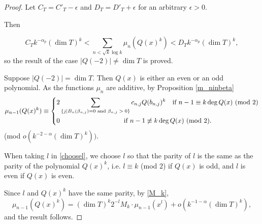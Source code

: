 \documentclass[11 pt]{amsart}
\theoremstyle{plain}
\newtheorem{lemma}[thm]{Lemma}
\theoremstyle{definition}
\theoremstyle{remark}
\def\Z{\mathbb{Z}}
\def\b{\beta}
\def\m{\mu}
\begin{document}
\begin{proof}
Let $C_T=C'_T - \epsilon$ and $D_T=D'_T + \epsilon$ for an arbitrary $\epsilon>0$.

Then

\begin{equation*}
    C_Tk^{-\alpha_p}(\dim T)^k <  \sum_{ n< \sqrt{k}\log k } \m_n(Q(x)^k)< D_T k^{-\alpha_p}(\dim T)^k,
\end{equation*}
so the result of the  case $\vert Q(-2)\vert \neq \dim T$ is proved.


\vspace{5mm}
\par
    Suppose $\vert Q(-2) \vert =\dim T$. Then $Q(x)$ is either an even or an odd polynomial. As the functions $\m_n$ are additive, by Proposition \ref{m_ninbeta} \begin{align*}
        \m_{n-1}(Q(x)^k)\equiv\begin{dcases}
            2 \sum_{\{j \mid B_n(\b_{n, j})=0 \text{ and $\b_{n, j} >0$}\}}c_{n, j }Q(b_{n, j})^k \quad \text{if $n-1  \equiv k \deg Q(x)$ (mod $2$)}\\
            0\qquad \qquad \qquad \qquad \quad \ \   \text{if $n-1 \not \equiv k \deg Q(x)$ (mod $2$)}.
        \end{dcases}
    \end{align*}
    (mod $o(k^{-2-\alpha} (\dim T)^k ))$.

    When taking $l$ in \eqref{choosel}, we choose $l$ so that the parity of $l$ is the same as the parity of the polynomial $Q(x)^k$, i.e. $l \equiv k$ (mod $2$) if $Q(x)$ is odd, and $l$ is even if $Q(x)$ is even. 
    
    Since $l$ and $Q(x)^k$ have the same parity, by \eqref{M_k}, $$\m_{n-1}(Q(x)^k)= (\dim T)^k 2^{-l}M_k \cdot \m_{n-1}(x^l) +o(k^{-1-\alpha}(\dim T)^k),$$ and the result follows.
\end{proof}


 

\printbibliography
\end{document}
